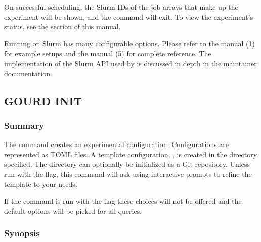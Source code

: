 \documentclass[a4paper,english]{article}
\begin{document}
\begin{adjustwidth}{18pt}{0pt}
\begin{Description}[Subcommands]
                        On successful scheduling, the Slurm IDs of the job arrays that make
                        up the experiment will be shown, and the command will exit.
                        To view the experiment's status, see the   section
                        of this manual.

                        Running on Slurm has many configurable options.
                        Please refer to the manual (1) for example setups
                        and the manual (5) for complete reference.
                        The implementation of the Slurm API used by  is discussed
                        in depth in the  maintainer documentation.
                \end{Description}

        \subsection{GOURD INIT}

            \subsubsection{Summary}
                The   command creates an experimental configuration.
                Configurations are represented as TOML files.
                A template configuration, , is created in the directory specified.
                The directory can optionally be initialized as a Git repository.
                Unless run with the  flag, this command will ask using interactive prompts
                to refine the template to your needs.

                If the command is run with the  flag these choices will not be offered and
                the default options will be picked for all queries.

            \subsubsection{Synopsis}
                 


\end{adjustwidth}
\end{document}
